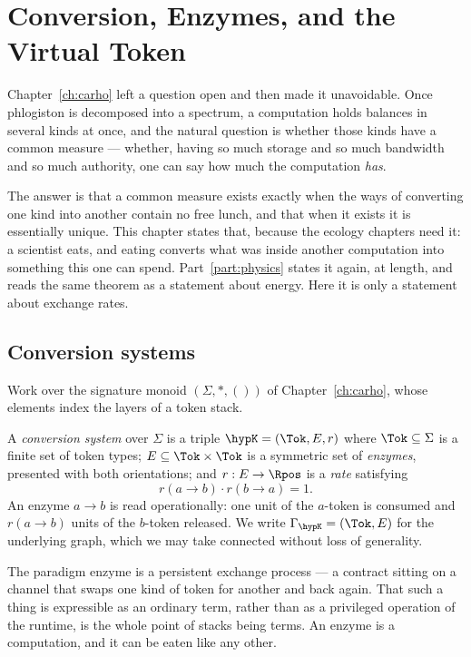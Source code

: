 \chapter{Conversion, Enzymes, and the Virtual Token}
\label{ch:vtok}

Chapter~\ref{ch:carho} left a question open and then made it unavoidable.
Once phlogiston is decomposed into a spectrum, a computation holds
balances in several kinds at once, and the natural question is whether
those kinds have a common measure --- whether, having so much storage and
so much bandwidth and so much authority, one can say how much the
computation \emph{has}.

The answer is that a common measure exists exactly when the ways of
converting one kind into another contain no free lunch, and that when it
exists it is essentially unique.
This chapter states that, because the ecology chapters need it: a
scientist eats, and eating converts what was inside another computation
into something this one can spend.
Part~\ref{part:physics} states it again, at length, and reads the same
theorem as a statement about energy.
Here it is only a statement about exchange rates.

\section{Conversion systems}

Work over the signature monoid $(\Sigma, \ast, ())$ of
Chapter~\ref{ch:carho}, whose elements index the layers of a token stack.

\begin{definition}
\label{def:conv-system}
A \emph{conversion system} over $\Sigma$ is a triple
$\hypK = (\Tok, E, r)$ where $\Tok \subseteq \Sigma$ is a finite set of
token types; $E \subseteq \Tok \times \Tok$ is a symmetric set of
\emph{enzymes}, presented with both orientations; and
$r : E \to \Rpos$ is a \emph{rate} satisfying
\[
  r(a \to b) \cdot r(b \to a) = 1 .
\]
An enzyme $a \to b$ is read operationally: one unit of the $a$-token is
consumed and $r(a \to b)$ units of the $b$-token released.
We write $\Gamma_{\hypK} = (\Tok, E)$ for the underlying graph, which we
may take connected without loss of generality.
\end{definition}

The paradigm enzyme is a persistent exchange process --- a contract
sitting on a channel that swaps one kind of token for another and back
again.
That such a thing is expressible as an ordinary term, rather than as a
privileged operation of the runtime, is the whole point of stacks being
terms.
An enzyme is a computation, and it can be eaten like any other.

